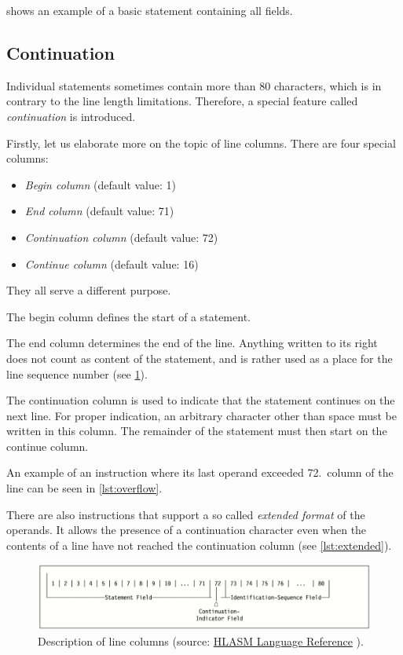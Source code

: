  shows an example of a basic statement containing all fields.



\subsection{Continuation}
\label{Continuation}

Individual statements sometimes contain more than 80 characters, which is in contrary to the line length limitations. Therefore, a special feature called \emph{continuation} is introduced.

Firstly, let us elaborate more on the topic of line columns. There are four special columns:
\begin{itemize}
	\item \emph{Begin column} (default value: 1)
	
	\item \emph{End column} (default value: 71)
	
	\item \emph{Continuation column} (default value: 72)
	
	\item \emph{Continue column} (default value: 16)
\end{itemize}
They all serve a different purpose.

The begin column defines the start of a statement.

The end column determines the end of the line. Anything written to its right does not count as content of the statement, and is rather used as a place for the line sequence number (see \cref{fig01:line}).

The continuation column is used to indicate that the statement continues on the next line. For proper indication, an arbitrary character other than space must be written in this column. The remainder of the statement must then start on the continue column.

An example of an instruction where its last operand exceeded 72.~column of the line can be seen in \cref{lst:overflow}.


There are also instructions that support a so called \emph{extended format} of the operands. It allows the presence of a continuation character even when the contents of a line have not reached the continuation column (see \cref{lst:extended}).



\begin{figure}
	\includegraphics[width=\textwidth]{img/line}
	\caption{Description of line columns (source: \href{https://www-01.ibm.com/servers/resourcelink/svc00100.nsf/pages/zOSV2R3sc264940/$file/asmr1023.pdf}{HLASM Language Reference} ).}
	\label{fig01:line}
\end{figure}


